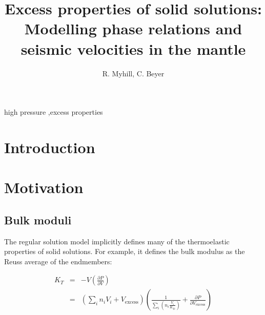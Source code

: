 \documentclass[review]{elsarticle}
\begin{document}
\begin{frontmatter}

\title{Excess properties of solid solutions: Modelling phase relations and seismic velocities in the mantle}

\author{R. Myhill, C. Beyer}
\address{Bayerisches Geoinstitut, Universit\"{a}t Bayreuth, Universit\"{a}tsstrasse 30, 95447 Bayreuth, Germany}

\begin{abstract}

\end{abstract}

\begin{keyword}
high pressure \sep excess properties
\end{keyword}

\end{frontmatter}

\linenumbers

\section{Introduction}

\section{Motivation}
\subsection{Bulk moduli}
The regular solution model implicitly defines many of the thermoelastic properties of solid solutions. For example, it defines the bulk modulus as the Reuss average of the endmembers:

\begin{eqnarray}
K_T &=& -V\left( \frac{\partial P}{\partial V}\right) \\
 &=& \left( \sum_i n_i V_{i} + V_{\textrm{excess}}\right) \left( \frac{1}{\sum_i\left(n_i \frac{V_{i}}{K_{Ti}} \right)} + \frac{\partial P}{\partial V_{\textrm{excess}}} \right) 
\end{eqnarray}
\end{document}
